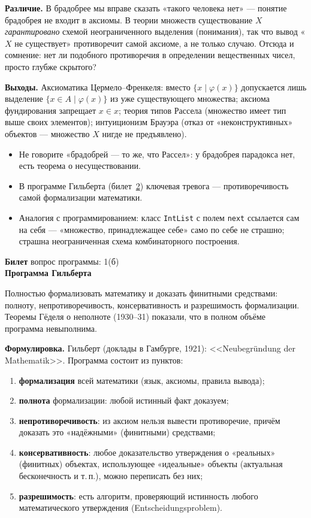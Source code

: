 \documentclass[11pt,a4paper]{article}
\theoremstyle{definition}
\newcounter{tk}
\newcommand{\ticket}[2]{%
  \clearpage
  \stepcounter{tk}%
  \phantomsection\label{T:\thetk}%
  \addcontentsline{toc}{subsection}{\protect\numberline{\thetk}#2}%
  \begin{center}
  \begin{tcolorbox}[colback=gray!8,colframe=gray!60,boxrule=0.5pt,arc=3pt,width=\linewidth]
  {\large\bfseries Билет \thetk}\hfill{\small вопрос программы: #1}\\[2pt]
  {\Large\bfseries #2}
  \end{tcolorbox}
  \end{center}
}
\begin{document}
\textbf{Различие.} В брадобрее мы вправе сказать «такого человека нет» --- понятие брадобрея
не входит в аксиомы. В теории множеств существование $X$ \emph{гарантировано} схемой неограниченного
выделения (понимания), так что вывод «$X$ не существует» противоречит самой аксиоме, а не только случаю.
Отсюда и сомнение: нет ли подобного противоречия в определении вещественных чисел, просто глубже скрытого?

\textbf{Выходы.} Аксиоматика Цермело--Френкеля: вместо $\{x\mid\varphi(x)\}$ допускается лишь
выделение $\{x\in A\mid\varphi(x)\}$ из уже существующего множества; аксиома фундирования запрещает $x\in x$;
теория типов Рассела (множество имеет тип выше своих элементов); интуиционизм Брауэра (отказ от «неконструктивных»
объектов --- множество $X$ нигде не предъявлено).

\begin{warn}
\begin{itemize}
\item Не говорите «брадобрей --- то же, что Рассел»: у брадобрея парадокса нет, есть теорема о несуществовании.
\item В программе Гильберта (билет~\hyperref[T:2]{2}) ключевая тревога --- противоречивость самой формализации математики.
\item Аналогия с программированием: класс \texttt{IntList} с полем \texttt{next} ссылается сам на себя --- «множество, принадлежащее себе» само по себе не страшно; страшна неограниченная схема комбинаторного построения.
\end{itemize}
\end{warn}

\ticket{1(б)}{Программа Гильберта}
\begin{short}
Полностью формализовать математику и доказать финитными средствами: полноту, непротиворечивость,
консервативность и разрешимость формализации. Теоремы Гёделя о неполноте (1930--31) показали, что в полном
объёме программа невыполнима.
\end{short}

\textbf{Формулировка.} Гильберт (доклады в Гамбурге, 1921): <<Neubegründung der Mathematik>>.
Программа состоит из пунктов:
\begin{enumerate}
\item \textbf{формализация} всей математики (язык, аксиомы, правила вывода);
\item \textbf{полнота} формализации: любой истинный факт доказуем;
\item \textbf{непротиворечивость}: из аксиом нельзя вывести противоречие, причём доказать это
  «надёжными» (финитными) средствами;
\item \textbf{консервативность}: любое доказательство утверждения о «реальных» (финитных) объектах, использующее
  «идеальные» объекты (актуальная бесконечность и т.\,п.), можно переписать без них;
\item \textbf{разрешимость}: есть алгоритм, проверяющий истинность любого математического утверждения
  (Entscheidungsproblem).
\end{enumerate}
\end{document}
